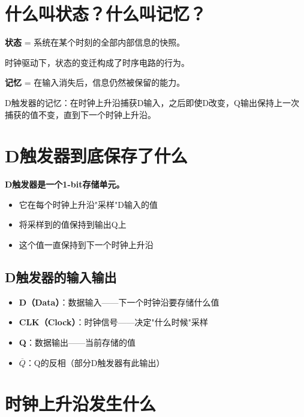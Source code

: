 \section{什么叫状态？什么叫记忆？}

\begin{definition}[状态]
\textbf{状态} = 系统在某个时刻的全部内部信息的快照。

时钟驱动下，状态的变迁构成了时序电路的行为。
\end{definition}

\begin{definition}[记忆]
\textbf{记忆} = 在输入消失后，信息仍然被保留的能力。

D触发器的记忆：在时钟上升沿捕获D输入，之后即使D改变，Q输出保持上一次捕获的值不变，直到下一个时钟上升沿。
\end{definition}

\section{D触发器到底保存了什么}

\begin{keypoint}[D触发器的本质]
\textbf{D触发器是一个1-bit存储单元。}

\begin{itemize}
  \item 它在每个时钟上升沿"采样"D输入的值
  \item 将采样到的值保持到输出Q上
  \item 这个值一直保持到下一个时钟上升沿
\end{itemize}
\end{keypoint}

\subsection{D触发器的输入输出}

\begin{itemize}
  \item \textbf{D（Data）}：数据输入——下一个时钟沿要存储什么值
  \item \textbf{CLK（Clock）}：时钟信号——决定"什么时候"采样
  \item \textbf{Q}：数据输出——当前存储的值
  \item \textbf{$\overline{Q}$}：Q的反相（部分D触发器有此输出）
\end{itemize}

\section{时钟上升沿发生什么}

